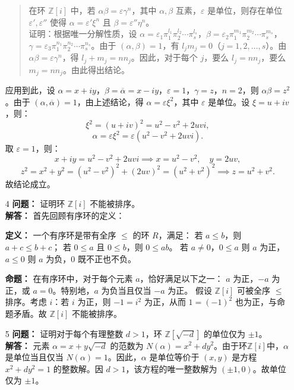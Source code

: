 \documentclass[UTF8]{ctexart}
\begin{document}
\begin{enumerate}
\begin{quote}
在环 \(\mathbb{Z}[i]\) 中，若 \(\alpha \beta = \varepsilon \gamma^n\)，其中 \(\alpha, \beta\) 互素，\(\varepsilon\) 是单位，则存在单位 \(\varepsilon', \varepsilon''\) 使得 \(\alpha = \varepsilon' \xi^n\) 且 \(\beta = \varepsilon'' \eta^n\)。\\
证明：根据唯一分解性质，设 \(\alpha = \varepsilon_1 \pi_1^{l_1} \pi_2^{l_2} \cdots \pi_s^{l_s}\)，\(\beta = \varepsilon_2 \pi_1^{m_1} \pi_2^{m_2} \cdots \pi_s^{m_s}\)，\(\gamma = \varepsilon_3 \pi_1^{n_1} \pi_2^{n_2} \cdots \pi_s^{n_s}\)。由于 \((\alpha, \beta) = 1\)，有 \(l_j m_j = 0\)（\(j = 1, 2, \dots, s\)）。由 \(\alpha \beta = \varepsilon \gamma^n\)，得 \(l_j + m_j = n n_j\)。因此，对于每个 \(j\)，要么 \(l_j = n n_j\)，要么 \(m_j = n n_j\)。由此得出结论。
\end{quote}

应用到此，设 \(\alpha = x + i y\)，\(\beta = \overline{\alpha} = x - i y\)，\(\varepsilon = 1\)，\(\gamma = z\)，\(n = 2\)，则 \(\alpha \beta = z^2\)。由于 \((\alpha, \overline{\alpha}) = 1\)，由上述结论，得 \(\alpha = \varepsilon \xi^2\)，其中 \(\varepsilon\) 是单位。设 \(\xi = u + i v\)，则：
\[
\xi^2 = (u + i v)^2 = u^2 - v^2 + 2uvi,
\]
\[
\alpha = \varepsilon \xi^2 = \varepsilon (u^2 - v^2 + 2uvi).
\]
取 \(\varepsilon = 1\)，则：
\[
x + i y = u^2 - v^2 + 2uvi \implies x = u^2 - v^2, \quad y = 2uv,
\]
\[
z^2 = x^2 + y^2 = (u^2 - v^2)^2 + (2uv)^2 = (u^2 + v^2)^2 \implies z = u^2 + v^2.
\]
故结论成立。

\item[4] 
\textbf{问题：} 证明环 \(\mathbb{Z}[i]\) 不能被排序。\\
\textbf{解答：} 首先回顾有序环的定义：  

\textbf{定义：} 一个有序环是带有全序 \(\leqslant\) 的环 \(R\)，满足：  
 若 \(a \leqslant b\)，则 \(a + c \leqslant b + c\)；  
 若 \(0 \leqslant a\) 且 \(0 \leqslant b\)，则 \(0 \leqslant ab\)。  
若 \(a \neq 0\)，\(0 \leqslant a\) 则 \(a\) 为正，\(a \leqslant 0\) 则 \(a\) 为负，\(0\) 既不正也不负。  

\textbf{命题：} 在有序环中，对于每个元素 \(a\)，恰好满足以下之一：
\(a\) 为正，\(-a\) 为正，或 \(a = 0\)。特别地，\(a\) 为负当且仅当 \(-a\) 为正。  
假设 \(\mathbb{Z}[i]\) 可被全序 \(\leqslant\) 排序。考虑 \(i\)：若 \(i\) 为正，则 \(-1 = i^2\) 为正，从而 \(1 = (-1)^2\) 也为正，与命题矛盾。故 \(\mathbb{Z}[i]\) 不能被排序。

\item[5] 
\textbf{问题：} 证明对于每个有理整数 \(d > 1\)，环 \(\mathbb{Z}[\sqrt{-d}]\) 的单位仅为 \(\pm 1\)。\\
\textbf{解答：} 元素 \(\alpha = x + y \sqrt{-d}\) 的范数为 \(N(\alpha) = x^2 + d y^2\)。由于环\(\mathbb{Z}[i]\)中，\(\alpha\) 是单位当且仅当 \(N(\alpha) = 1\)。因此，\(\alpha\) 是单位等价于 \((x, y)\) 是方程 \(x^2 + d y^2 = 1\) 的整数解。因 \(d > 1\)，该方程的唯一整数解为 \((\pm 1, 0)\)。故单位仅为 \(\pm 1\)。 


\end{enumerate}
\end{document}
